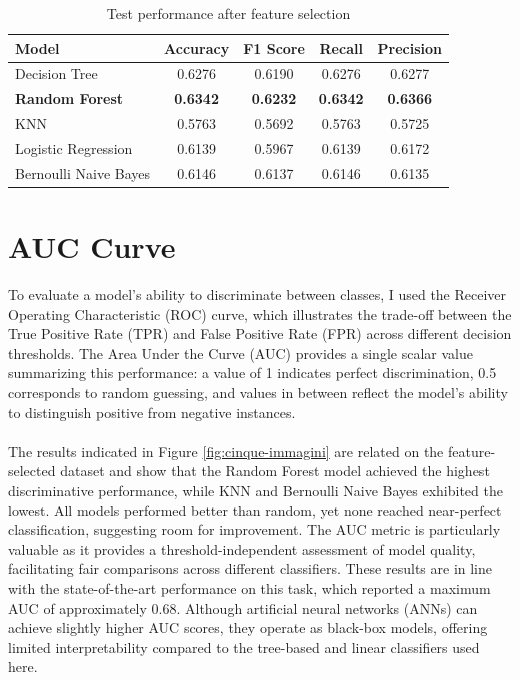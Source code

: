 \begin{table}[ht]
\centering
\caption{Test performance after feature selection}
\label{tab:test_performance_reduced}
\begin{tabular}{lcccc}
\toprule
\textbf{Model} & \textbf{Accuracy} & \textbf{F1 Score} & \textbf{Recall} & \textbf{Precision} \\
\midrule
Decision Tree & 0.6276 & 0.6190 & 0.6276 & 0.6277 \\
\textbf{Random Forest} & \textbf{0.6342} & \textbf{0.6232} & \textbf{0.6342} & \textbf{0.6366} \\
KNN & 0.5763 & 0.5692 & 0.5763 & 0.5725 \\
Logistic Regression & 0.6139 & 0.5967 & 0.6139 & 0.6172 \\
Bernoulli Naive Bayes & 0.6146 & 0.6137 & 0.6146 & 0.6135 \\
\bottomrule
\end{tabular}
\end{table}

\section{AUC Curve}

To evaluate a model's ability to discriminate between classes, I used the Receiver Operating Characteristic (ROC) curve, which illustrates the trade-off between the True Positive Rate (TPR) and False Positive Rate (FPR) across different decision thresholds. The Area Under the Curve (AUC) provides a single scalar value summarizing this performance: a value of 1 indicates perfect discrimination, 0.5 corresponds to random guessing, and values in between reflect the model's ability to distinguish positive from negative instances.\\\\
The results indicated in Figure \ref{fig:cinque-immagini} are related on the feature-selected dataset and show that the Random Forest model achieved the highest discriminative performance, while KNN and Bernoulli Naive Bayes exhibited the lowest. All models performed better than random, yet none reached near-perfect classification, suggesting room for improvement. The AUC metric is particularly valuable as it provides a threshold-independent assessment of model quality, facilitating fair comparisons across different classifiers. These results are in line with the state-of-the-art performance on this task, which reported a maximum AUC of approximately 0.68. Although artificial neural networks (ANNs) can achieve slightly higher AUC scores, they operate as black-box models, offering limited interpretability compared to the tree-based and linear classifiers used here.

